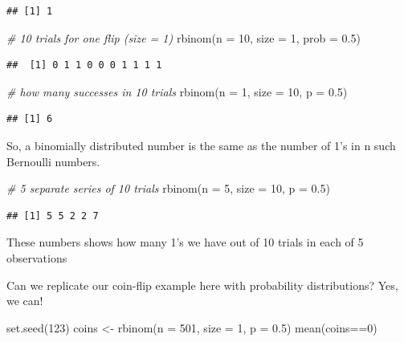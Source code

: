 \documentclass[
]{book}
\newenvironment{Shaded}{\begin{snugshade}}{\end{snugshade}}
\newcommand{\AttributeTok}[1]{\textcolor[rgb]{0.77,0.63,0.00}{#1}}
\newcommand{\CommentTok}[1]{\textcolor[rgb]{0.56,0.35,0.01}{\textit{#1}}}
\newcommand{\DecValTok}[1]{\textcolor[rgb]{0.00,0.00,0.81}{#1}}
\newcommand{\FloatTok}[1]{\textcolor[rgb]{0.00,0.00,0.81}{#1}}
\newcommand{\FunctionTok}[1]{\textcolor[rgb]{0.00,0.00,0.00}{#1}}
\newcommand{\NormalTok}[1]{#1}
\newcommand{\OtherTok}[1]{\textcolor[rgb]{0.56,0.35,0.01}{#1}}
\newcommand{\SpecialCharTok}[1]{\textcolor[rgb]{0.00,0.00,0.00}{#1}}
\begin{document}
\begin{verbatim}
## [1] 1
\end{verbatim}

\begin{Shaded}
\begin{Highlighting}[]
\CommentTok{\# 10 trials for one flip (size = 1)}
\FunctionTok{rbinom}\NormalTok{(}\AttributeTok{n =} \DecValTok{10}\NormalTok{, }\AttributeTok{size =} \DecValTok{1}\NormalTok{, }\AttributeTok{prob =} \FloatTok{0.5}\NormalTok{)}
\end{Highlighting}
\end{Shaded}

\begin{verbatim}
##  [1] 0 1 1 0 0 0 1 1 1 1
\end{verbatim}

\begin{Shaded}
\begin{Highlighting}[]
\CommentTok{\# how many successes in 10 trials}
\FunctionTok{rbinom}\NormalTok{(}\AttributeTok{n =} \DecValTok{1}\NormalTok{, }\AttributeTok{size =} \DecValTok{10}\NormalTok{, }\AttributeTok{p =} \FloatTok{0.5}\NormalTok{)}
\end{Highlighting}
\end{Shaded}

\begin{verbatim}
## [1] 6
\end{verbatim}

So, a binomially distributed number is the same as the number of 1's in n such Bernoulli numbers.

\begin{Shaded}
\begin{Highlighting}[]
\CommentTok{\# 5 separate series of 10 trials}
\FunctionTok{rbinom}\NormalTok{(}\AttributeTok{n =} \DecValTok{5}\NormalTok{, }\AttributeTok{size =} \DecValTok{10}\NormalTok{, }\AttributeTok{p =} \FloatTok{0.5}\NormalTok{)}
\end{Highlighting}
\end{Shaded}

\begin{verbatim}
## [1] 5 5 2 2 7
\end{verbatim}

These numbers shows how many 1's we have out of 10 trials in each of 5 observations

Can we replicate our coin-flip example here with probability distributions? Yes, we can!

\begin{Shaded}
\begin{Highlighting}[]
\FunctionTok{set.seed}\NormalTok{(}\DecValTok{123}\NormalTok{)}
\NormalTok{coins }\OtherTok{\textless{}{-}} \FunctionTok{rbinom}\NormalTok{(}\AttributeTok{n =} \DecValTok{501}\NormalTok{, }\AttributeTok{size =} \DecValTok{1}\NormalTok{, }\AttributeTok{p =} \FloatTok{0.5}\NormalTok{)}
\FunctionTok{mean}\NormalTok{(coins}\SpecialCharTok{==}\DecValTok{0}\NormalTok{)}
\end{Highlighting}
\end{Shaded}
\end{document}
